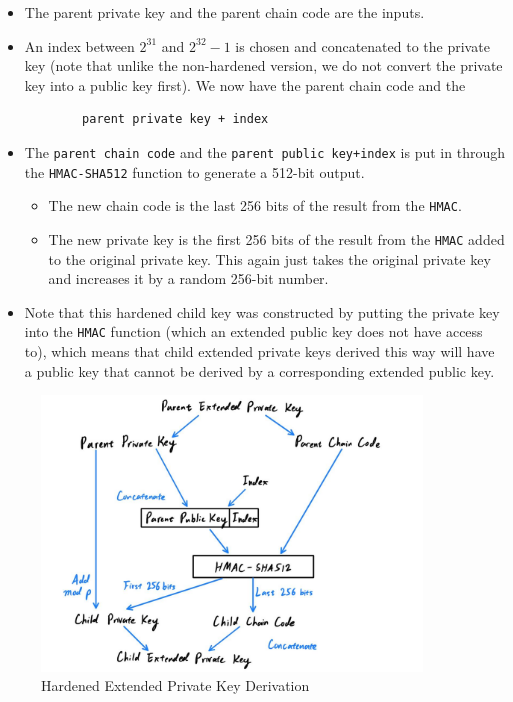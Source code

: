 \documentclass{article}
\begin{document}
    \begin{itemize}
      \item The parent private key and the parent chain code are the inputs.
      \item An index between $2^{31}$ and $2^{32}-1$ is chosen and concatenated to the private key (note that unlike the non-hardened version, we do not convert the private key into a public key first). We now have the parent chain code and the
      \begin{lstlisting}
        parent private key + index
      \end{lstlisting}
      \item The \texttt{parent chain code} and the \texttt{parent public key+index} is put in through the \texttt{HMAC-SHA512} function to generate a 512-bit output.
      \begin{itemize}
        \item The new chain code is the last 256 bits of the result from the \texttt{HMAC}.
        \item The new private key is the first 256 bits of the result from the \texttt{HMAC} added to the original private key. This again just takes the original private key and increases it by a random 256-bit number.
      \end{itemize}
      \item Note that this hardened child key was constructed by putting the private key into the \texttt{HMAC} function (which an extended public key does not have access to), which means that child extended private keys derived this way will have a public key that cannot be derived by a corresponding extended public key.
    \end{itemize}

    \begin{figure}[H]
    \centering
    \includegraphics[width=0.9\textwidth]{img/hardened.jpg}
    \caption{Hardened Extended Private Key Derivation}
    \end{figure}
\end{document}
